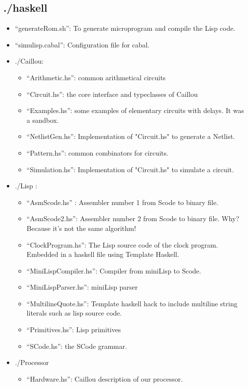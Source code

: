 \documentclass[a4paper, 11pt]{article}
\begin{document}
\subsection{./haskell}
\begin{itemize}
\item \enquote{generateRom.sh}: To generate microprogram and compile the Lisp code.
\item \enquote{simulisp.cabal}: Configuration file for cabal.
\item ./Caillou:
\begin{itemize}
\item \enquote{Arithmetic.hs}:  common arithmetical circuits
\item \enquote{Circuit.hs}: the core interface and typeclasses of Caillou
\item \enquote{Examples.hs}: some examples of elementary circuits with delays. It was a sandbox.
\item \enquote{NetlistGen.hs}: Implementation of "Circuit.hs" to generate a Netlist.
\item \enquote{Pattern.hs}: common combinators for circuits.
\item \enquote{Simulation.hs}: Implementation of "Circuit.hs" to simulate a circuit.
\end{itemize}
\item ./Lisp : 
\begin{itemize}
\item \enquote{AsmScode.hs} : Assembler number 1 from Scode to binary file.
\item \enquote{AsmScode2.hs}: Assembler number 2 from Scode to binary file. Why? Because
it's not the same algorithm!
\item \enquote{ClockProgram.hs}: The Lisp source code of the clock program. Embedded in
a haskell file using Template Haskell.
\item \enquote{MiniLispCompiler.hs}: Compiler from miniLisp to Scode.
\item \enquote{MiniLispParser.hs}: miniLisp parser
\item \enquote{MultilineQuote.hs}: Template haskell hack to include multiline string
literals such as lisp source code.
\item \enquote{Primitives.hs}: Lisp primitives
\item \enquote{SCode.hs}: the SCode grammar.  
\end{itemize}
\item ./Processor 
\begin{itemize}
\item \enquote{Hardware.hs}: Caillou description of our processor. 

\end{itemize}
\end{itemize}
\end{document}
